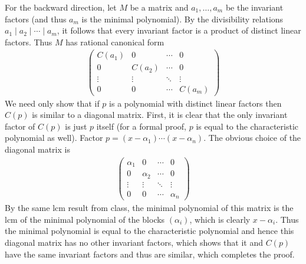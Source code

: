 \documentclass[12pt]{article}
\theoremstyle{definitionstyle}
\begin{document}
\begin{enumerate}
		For the backward direction, let $M$ be a matrix and $a_1, \ldots, a_m$ be the invariant factors (and thus $a_m$ is the minimal polynomial). By the divisibility relations $a_1 \mid a_2 \mid \cdots \mid a_m$, it follows that every invariant factor is a product of distinct linear factors. Thus $M$ has rational canonical form
		\begin{align*}
			\begin{pmatrix}
				C(a_1) & 0 & \cdots & 0 \\
				0 & C(a_2) & \cdots & 0 \\
				\vdots & \vdots & \ddots & \vdots \\
				0 & 0 & \cdots & C(a_m)
			\end{pmatrix}
		\end{align*}
		We need only show that if $p$ is a polynomial with distinct linear factors then $C(p)$ is similar to a diagonal matrix. First, it is clear that the only invariant factor of $C(p)$ is just $p$ itself (for a formal proof, $p$ is equal to the characteristic polynomial as well). Factor $p = (x-\alpha_1) \cdots (x-\alpha_n)$. The obvious choice of the diagonal matrix is
		\begin{align*}
			\begin{pmatrix}
				\alpha_1 & 0 & \cdots & 0 \\
				0 & \alpha_2 & \cdots & 0 \\
				\vdots & \vdots & \ddots & \vdots \\
				0 & 0 & \cdots & \alpha_n
			\end{pmatrix}
		\end{align*}
		By the same lcm result from class, the minimal polynomial of this matrix is the lcm of the minimal polynomial of the blocks $(\alpha_i)$, which is clearly $x-\alpha_i$. Thus the minimal polynomial is equal to the characteristic polynomial and hence this diagonal matrix has no other invariant factors, which shows that it and $C(p)$ have the same invariant factors and thus are similar, which completes the proof.
		

\end{enumerate}
\end{document}
